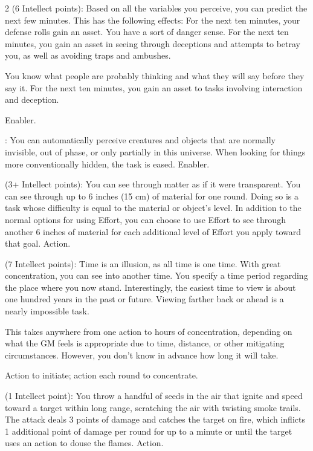 \begin{multicols}{2}
 (6 Intellect points): Based on all the variables you perceive, you can predict the next few minutes. This has the following effects: 
For the next ten minutes, your defense rolls gain an asset. 
You have a sort of danger sense. For the next ten minutes, you gain an asset in seeing through deceptions and attempts to betray you, as well as avoiding traps and ambushes. 

You know what people are probably thinking and what they will say before they say it. For the next ten minutes, you gain an asset to tasks involving interaction and deception. 

Enabler. 
 
: You can automatically perceive creatures and objects that are normally invisible, out of phase, or only partially in this universe. When looking for things more conventionally hidden, the task is eased. Enabler. 
 
 (3+ Intellect points): You can see through matter as if it were transparent. You can see through up to 6 inches (15 cm) of material for one round. Doing so is a task whose difficulty is equal to the material or object’s level. In addition to the normal options for using Effort, you can choose to use Effort to see through another 6 inches of material for each additional level of Effort you apply toward that goal. Action. 
 
 (7 Intellect points): Time is an illusion, as all time is one time. With great concentration, you can see into another time. You specify a time period regarding the place where you now stand. Interestingly, the easiest time to view is about one hundred years in the past or future. Viewing farther back or ahead is a nearly impossible task. 

This takes anywhere from one action to hours of concentration, depending on what the GM feels is appropriate due to time, distance, or other mitigating circumstances. However, you don’t know in advance how long it will take.

Action to initiate; action each round to concentrate. 
 
 (1 Intellect point): You throw a handful of seeds in the air that ignite and speed toward a target within long range, scratching the air with twisting smoke trails. The attack deals 3 points of damage and catches the target on fire, which inflicts 1 additional point of damage per round for up to a minute or until the target uses an action to douse the flames. Action. 
 

\end{multicols}
